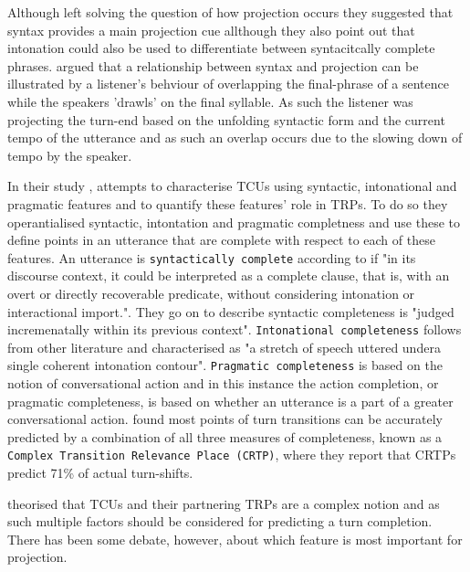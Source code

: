 \documentclass[logo,bsc,singlespacing,parskip]{infthesis}
\begin{document}
Although \cite{Sacks1996} left solving the question of how projection occurs they suggested that syntax provides a main projection cue allthough they also point out that intonation could also be used to differentiate between syntacitcally complete phrases. \cite{Sacks1974} argued that a relationship between syntax and projection can be illustrated by a listener's behviour of overlapping the final-phrase of a sentence while the speakers 'drawls' on the final syllable. As such the listener was projecting the turn-end based on the unfolding syntactic form and the current tempo of the utterance and as such an overlap occurs due to the slowing down of tempo by the speaker. 

In their study \cite{Ford1996}, attempts to characterise TCUs using syntactic, intonational and pragmatic features and to quantify these features' role in TRPs. To do so they operantialised syntactic, intontation and pragmatic completness and use these to define points in an utterance that are complete with respect to each of these features. An utterance is \texttt{syntactically complete} according to \cite{Ford1996} if "in its discourse context, it could be interpreted as a complete clause, that is, with an overt or directly recoverable predicate, without considering intonation or interactional import.". They go on to describe syntactic completeness is "judged incremenatally within its previous context". \texttt{Intonational completeness} follows from other literature \cite{DuBoise1993} and characterised as "a stretch of speech uttered undera single coherent intonation contour". \texttt{Pragmatic completeness} is based on the notion of conversational action and in this instance the action completion, or pragmatic completeness, is based on whether an utterance is a part of a greater conversational action. \cite{Ford1996} found most points of turn transitions can be accurately predicted by a combination of all three measures of completeness, known as a \texttt{Complex Transition Relevance Place (CRTP)}, where they report that CRTPs predict 71\% of actual turn-shifts. 

\cite{Ford1996} theorised that TCUs and their partnering TRPs are a complex notion and as such multiple factors should be considered for predicting a turn completion. There has been some debate, however, about which feature is most important for projection. 
\end{document}
